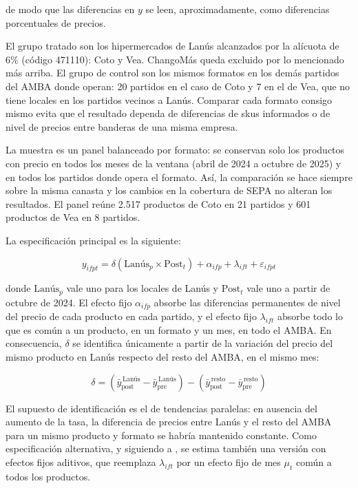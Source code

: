 de modo que las diferencias en \(y\) se leen, aproximadamente, como diferencias porcentuales de precios.

El grupo tratado son los hipermercados de Lanús alcanzados por la alícuota de 6\% (código 471110): Coto y Vea. ChangoMás queda excluido por lo mencionado más arriba. El grupo de control son los mismos formatos en los demás partidos del AMBA donde operan: 20 partidos en el caso de Coto y 7 en el de Vea, que no tiene locales en los partidos vecinos a Lanús. Comparar cada formato consigo mismo evita que el resultado dependa de diferencias de skus informados o de nivel de precios entre banderas de una misma empresa.

La muestra es un panel balanceado por formato: se conservan solo los productos con precio en todos los meses de la ventana (abril de 2024 a octubre de 2025) y en todos los partidos donde opera el formato. Así, la comparación se hace siempre sobre la misma canasta y los cambios en la cobertura de SEPA no alteran los resultados. El panel reúne 2.517 productos de Coto en 21 partidos y 601 productos de Vea en 8 partidos.

La especificación principal es la siguiente:

\begin{equation}\label{eq:2}
  y_{ifpt} = \delta\left( \text{Lanús}_{p} \times \text{Post}_{t} \right) + \alpha_{ifp} + \lambda_{ift} + \varepsilon_{ifpt}
\end{equation}

donde \(\text{Lanús}_{p}\) vale uno para los locales de Lanús y \(\text{Post}_{t}\) vale uno a partir de octubre de 2024. El efecto fijo \(\alpha_{ifp}\) absorbe las diferencias permanentes de nivel del precio de cada producto en cada partido, y el efecto fijo \(\lambda_{ift}\) absorbe todo lo que es común a un producto, en un formato y un mes, en todo el AMBA. En consecuencia, \(\delta\) se identifica únicamente a partir de la variación del precio del mismo producto en Lanús respecto del resto del AMBA, en el mismo mes:

\begin{equation}\label{eq:3}
  \delta = \left( {\bar{y}}_{\text{post}}^{\,\text{Lanús}} - {\bar{y}}_{\text{pre}}^{\,\text{Lanús}} \right) - \left( {\bar{y}}_{\text{post}}^{\,\text{resto}} - {\bar{y}}_{\text{pre}}^{\,\text{resto}} \right)
\end{equation}

El supuesto de identificación es el de tendencias paralelas: en ausencia del aumento de la tasa, la diferencia de precios entre Lanús y el resto del AMBA para un mismo producto y formato se habría mantenido constante. Como especificación alternativa, y siguiendo a \textcite{cawley2018}, se estima también una versión con efectos fijos aditivos, que reemplaza \(\lambda_{ift}\) por un efecto fijo de mes \(\mu_{t}\) común a todos los productos.

